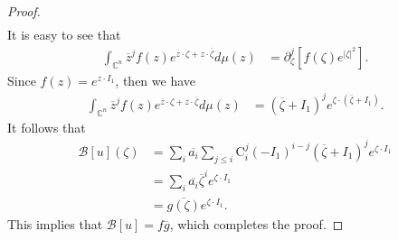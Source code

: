 \documentclass[11pt,reqno]{amsart}
\theoremstyle{definition}
\begin{document}
\begin{proof}
\begin{align*}
\end{align*}
It is easy to see that
\begin{align*}
\int_{\mathbb{C}^n} \overline{z}^j f(z) e^{\overline{z}\cdot \zeta+z\cdot \overline{\zeta}}d\mu(z)&=\partial_\zeta^j[f(\zeta)e^{|\zeta|^2}].
\end{align*}
Since $f(z)=e^{z\cdot I_1}$, then we have
\begin{align*}
\int_{\mathbb{C}^n} \overline{z}^j f(z) e^{\overline{z}\cdot \zeta+z\cdot \overline{\zeta}}d\mu(z)&=(\overline{\zeta}+I_1)^je^{\zeta\cdot(\overline{\zeta}+I_1)}.
\end{align*}
It follows that
\begin{align*}
\mathcal{B}[u](\zeta) &=\sum_i \overline{a_i} \sum_{j\leq i}\mathrm{C}_{i}^j(-I_1)^{i-j}(\overline{\zeta}+I_1)^j e^{\zeta\cdot I_1}\\
&=\sum_i \overline{a_i} \overline{\zeta}^i e^{\zeta\cdot I_1} \\
&=\overline{g(\zeta)}e^{\zeta\cdot I_1}.
\end{align*}
This implies that $\mathcal{B}[u]=f\overline{g}$, which completes the proof.
\end{proof}

\end{document}
